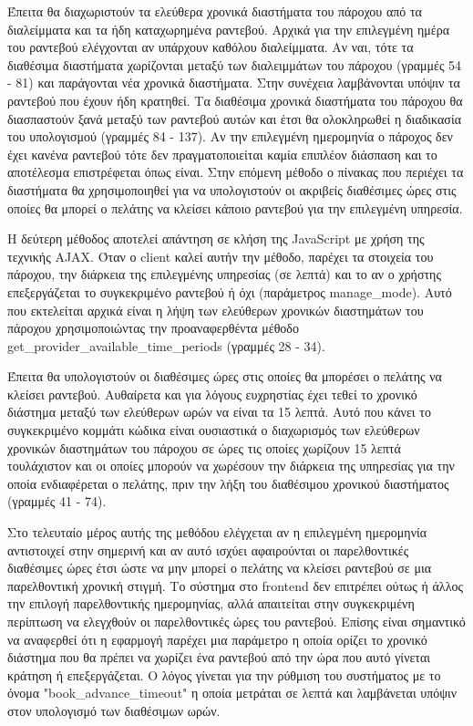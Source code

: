 Έπειτα θα διαχωριστούν τα ελεύθερα χρονικά διαστήματα του πάροχου από τα διαλείμματα και τα ήδη καταχωρημένα ραντεβού. Αρχικά για την επιλεγμένη ημέρα του ραντεβού ελέγχονται αν υπάρχουν καθόλου διαλείμματα. Αν ναι, τότε τα διαθέσιμα διαστήματα χωρίζονται μεταξύ των διαλειμμάτων του πάροχου (γραμμές 54 - 81) και παράγονται νέα χρονικά διαστήματα. Στην συνέχεια λαμβάνονται υπόψιν τα ραντεβού που έχουν ήδη κρατηθεί. Τα διαθέσιμα χρονικά διαστήματα του πάροχου θα διασπαστούν ξανά μεταξύ των ραντεβού αυτών και έτσι θα ολοκληρωθεί η διαδικασία του υπολογισμού (γραμμές 84 - 137). Αν την επιλεγμένη ημερομηνία ο πάροχος δεν έχει κανένα ραντεβού τότε δεν πραγματοποιείται καμία επιπλέον διάσπαση και το αποτέλεσμα επιστρέφεται όπως είναι. Στην επόμενη μέθοδο ο πίνακας που περιέχει τα διαστήματα θα χρησιμοποιηθεί για να υπολογιστούν οι ακριβείς διαθέσιμες ώρες στις οποίες θα μπορεί ο πελάτης να κλείσει κάποιο ραντεβού για την επιλεγμένη υπηρεσία.



Η δεύτερη μέθοδος αποτελεί απάντηση σε κλήση της JavaScript με χρήση της τεχνικής AJAX. Όταν ο client καλεί αυτήν την μέθοδο, παρέχει τα στοιχεία του πάροχου, την διάρκεια της επιλεγμένης υπηρεσίας (σε λεπτά) και το αν ο χρήστης επεξεργάζεται το συγκεκριμένο ραντεβού ή όχι (παράμετρος manage\_mode). Αυτό που εκτελείται αρχικά είναι η λήψη των ελεύθερων χρονικών διαστημάτων του πάροχου χρησιμοποιώντας την προαναφερθέντα μέθοδο get\_provider\_available\_time\_periods (γραμμές 28 - 34). 

Έπειτα θα υπολογιστούν οι διαθέσιμες ώρες στις οποίες θα μπορέσει ο πελάτης να κλείσει ραντεβού. Αυθαίρετα και για λόγους ευχρηστίας έχει τεθεί το χρονικό διάστημα μεταξύ των ελεύθερων ωρών να είναι τα 15 λεπτά. Αυτό που κάνει το συγκεκριμένο κομμάτι κώδικα είναι ουσιαστικά ο διαχωρισμός των ελεύθερων χρονικών διαστημάτων του πάροχου σε ώρες τις οποίες χωρίζουν 15 λεπτά τουλάχιστον και οι οποίες μπορούν να χωρέσουν την διάρκεια της υπηρεσίας για την οποία ενδιαφέρεται ο πελάτης, πριν την λήξη του διαθέσιμου χρονικού διαστήματος (γραμμές 41 - 74).

Στο τελευταίο μέρος αυτής της μεθόδου ελέγχεται αν η επιλεγμένη ημερομηνία αντιστοιχεί στην σημερινή και αν αυτό ισχύει αφαιρούνται οι παρελθοντικές διαθέσιμες ώρες έτσι ώστε να μην μπορεί ο πελάτης να κλείσει ραντεβού σε μια παρελθοντική χρονική στιγμή. Το σύστημα στο frontend δεν επιτρέπει ούτως ή άλλος την επιλογή παρελθοντικής ημερομηνίας, αλλά απαιτείται στην συγκεκριμένη περίπτωση να ελεγχθούν οι παρελθοντικές ώρες του ραντεβού. Επίσης είναι σημαντικό να αναφερθεί ότι η εφαρμογή παρέχει μια παράμετρο η οποία ορίζει το χρονικό διάστημα που θα πρέπει να χωρίζει ένα ραντεβού από την ώρα που αυτό γίνεται κράτηση ή επεξεργάζεται. Ο λόγος γίνεται για την ρύθμιση του συστήματος με το όνομα "book\_advance\_timeout" η οποία μετράται σε λεπτά και λαμβάνεται υπόψιν στον υπολογισμό των διαθέσιμων ωρών.

